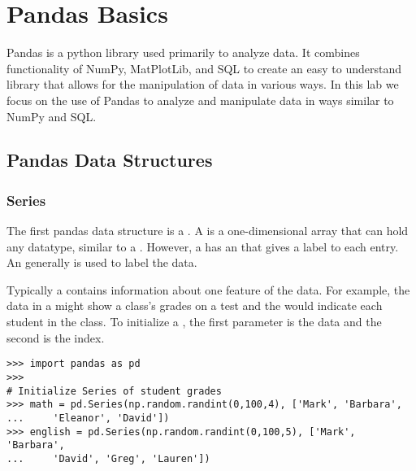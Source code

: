 \label{lab:pandas1}

\section*{Pandas Basics}

Pandas is a python library used primarily to analyze data.
It combines functionality of NumPy, MatPlotLib, and SQL to create an easy to understand library that allows for the manipulation of data in various ways.
In this lab we focus on the use of Pandas to analyze and manipulate data in ways similar to NumPy and SQL.

\subsection*{Pandas Data Structures}

\subsubsection*{Series}

The first pandas data structure is a .
A  is a one-dimensional array that can hold any datatype, similar to a .
However, a  has an  that gives a label to each entry.
An  generally is used to label the data.

Typically a  contains information about one feature of the data.
For example, the data in a  might show a class's grades on a test and the  would indicate each student in the class.
To initialize a , the first parameter is the data and the second is the index.

\begin{lstlisting}
>>> import pandas as pd
>>>
# Initialize Series of student grades
>>> math = pd.Series(np.random.randint(0,100,4), ['Mark', 'Barbara', 
...		'Eleanor', 'David'])
>>> english = pd.Series(np.random.randint(0,100,5), ['Mark', 'Barbara',
...		'David', 'Greg', 'Lauren'])
\end{lstlisting}

